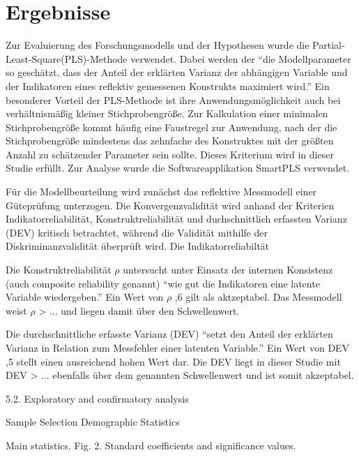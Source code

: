 \section{Ergebnisse}
\label{sec:ergebnisse}
\nocite{lohmoller2013latent}
Zur Evaluierung des Forschungsmodells und der Hypothesen wurde die Partial-Least-Square(PLS)-Methode verwendet. Dabei werden der "`die Modellparameter so geschätzt, dass der Anteil der erklärten Varianz der abhängigen Variable und der Indikatoren eines reflektiv gemessenen Konstrukts maximiert wird."'\parencite[S.16]{nitzl2010anwenderorientierte} Ein besonderer Vorteil der PLS-Methode ist ihre Anwendungsmöglichkeit auch bei verhältnismäßig kleiner Stichprobengröße. Zur Kalkulation einer minimalen Stichprobengröße kommt häufig eine Faustregel zur Anwendung, nach der die Stichprobengröße mindestens das zehnfache des Konstruktes mit der größten Anzahl zu schätzender Parameter sein sollte.\parencite[vgl.][S.394]{islam2013investigating} Dieses Kriterium wird in dieser Studie erfüllt. Zur Analyse wurde die Softwareapplikation SmartPLS verwendet. 

Für die Modellbeurteilung wird zunächst das reflektive Messmodell einer Güteprüfung unterzogen. Die Konvergenzvalidität wird anhand der Kriterien Indikatorreliabilität, Konstruktreliabilität und duchschnittlich erfassten Varianz (DEV) kritisch betrachtet, während die Validität mithilfe der Diskriminanzvalidität überprüft wird.
Die Indikatorreliabiltät 

Die Konstruktreliabilität $\rho$ untersucht unter Einsatz der internen Konsistenz (auch composite reliability genannt) "`wie gut die Indikatoren eine latente Variable wiedergeben."' Ein Wert von $\rho$ ,6 gilt als aktzeptabel.\parencite[vgl.][S.212]{ringle2007beurteilung} Das Messmodell weist $\rho$ > ... und liegen damit über den Schwellenwert. 

Die durchschnittliche erfasste Varianz (DEV) "`setzt den Anteil der erklärten Varianz in Relation zum Messfehler einer latenten Variable."' \parencite[S.25]{nitzl2010anwenderorientierte} Ein Wert von DEV ,5 stellt einen ausreichend hohen Wert dar. Die DEV liegt in dieser Studie mit DEV > ... ebenfalls über dem genannten Schwellenwert und ist somit akzeptabel. 


5.2. Exploratory and confirmatory analysis

Sample Selection
Demographic Statistics

Main statistics.
Fig. 2. Standard coefficients and significance values.

